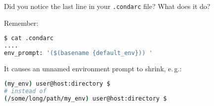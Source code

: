 \begin{frame}[fragile]
   \frametitle{}
   \begin{question}
   	Did you notice the last line in your \texttt{.condarc} file? What does it do?
   \end{question} 
   Remember:
     \begin{lstlisting}[language=Bash, style=Shell]
$ cat .condarc
....
env_prompt: '($(basename {default_env})) '
   \end{lstlisting}
   \pause
   It causes an unnamed environment prompt to shrink, e.\,g.:
   \begin{lstlisting}[language=Bash, style=Plain]
(my_env) user@host:directory $
# instead of
(/some/long/path/my_env) user@host:directory $
   \end{lstlisting}
\end{frame}



